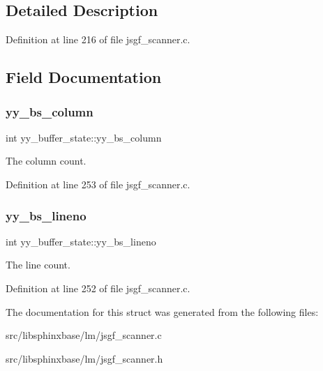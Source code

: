 \subsection{Detailed Description}


Definition at line 216 of file jsgf\+\_\+scanner.\+c.



\subsection{Field Documentation}
\mbox{\label{structyy__buffer__state_a10c4fcd8be759e6bf11e6d3e8cdb0307}} 
\subsubsection{yy\+\_\+bs\+\_\+column}
{\footnotesize\ttfamily int yy\+\_\+buffer\+\_\+state\+::yy\+\_\+bs\+\_\+column}



The column count. 



Definition at line 253 of file jsgf\+\_\+scanner.\+c.

\mbox{\label{structyy__buffer__state_a818e94bc9c766e683c60df1e9fd01199}} 
\subsubsection{yy\+\_\+bs\+\_\+lineno}
{\footnotesize\ttfamily int yy\+\_\+buffer\+\_\+state\+::yy\+\_\+bs\+\_\+lineno}



The line count. 



Definition at line 252 of file jsgf\+\_\+scanner.\+c.



The documentation for this struct was generated from the following files\+:\begin{DoxyCompactItemize}
\item 
src/libsphinxbase/lm/jsgf\+\_\+scanner.\+c\item 
src/libsphinxbase/lm/jsgf\+\_\+scanner.\+h\end{DoxyCompactItemize}
